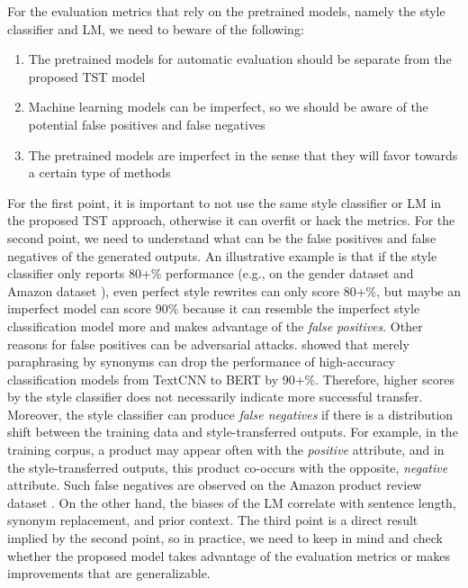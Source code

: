 For the evaluation metrics that rely on the pretrained models, namely the style classifier and LM, we need to beware of the following:
\begin{enumerate}
    \item The pretrained models for automatic evaluation should be separate from the proposed TST model
    \item Machine learning models can be imperfect, so we should be aware of the potential false positives and false negatives
    \item The pretrained models are imperfect in the sense that they will favor towards a certain type of methods
\end{enumerate}
For the first point, it is important to not use the same style classifier or LM in the proposed TST approach, otherwise it can overfit or hack the metrics.
For the second point, we need to understand what can be the false positives and false negatives of the generated outputs. An illustrative example is that if the style classifier only reports 80+\% performance (e.g., on the gender dataset  and Amazon dataset ), even perfect style rewrites can only score 80+\%, but maybe an imperfect model can score 90\% because it can resemble the imperfect style classification model more and makes advantage of the \textit{false positives}.
Other reasons for false positives can be adversarial attacks.  showed that merely paraphrasing by synonyms can drop the performance of high-accuracy classification models from TextCNN  to BERT  by 90+\%. Therefore, higher scores by the style classifier does not necessarily indicate more successful transfer.
Moreover, the style classifier can produce \textit{false negatives} if there is a distribution shift between the training data and style-transferred outputs. For example, in the training corpus, a product may appear often with the \textit{positive} attribute, and in the style-transferred outputs, this product co-occurs with the opposite, \textit{negative} attribute. Such false negatives are observed on the Amazon product review dataset . On the other hand, the biases of the LM correlate with sentence length, synonym replacement, and prior context. 
The third point is a direct result implied by the second point, so in practice, we need to keep in mind and check whether the proposed model takes advantage of the evaluation metrics or makes improvements that are generalizable.

